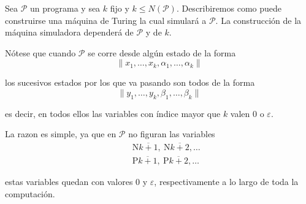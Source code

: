 \begin{frame}
	\PN Sea $\mathcal{P}$ un programa y sea $k$ fijo y $k \leq N(\mathcal{P})$. Describiremos como puede construirse una
	máquina de Turing la cual simulará a $\mathcal{P}$. La construcción de la máquina simuladora dependerá de
	$\mathcal{P}$ y de $k$.

	\PN Nótese que cuando $\mathcal{P}$ se corre desde algún estado de la forma
	\begin{equation*}
		\lVert x_{1}, \dotsc, x_{k}, \alpha_{1}, \dotsc, \alpha_{k} \rVert
	\end{equation*}

	\PN los sucesivos estados por los que va pasando son todos de la forma
	\begin{equation*}
		\lVert y_{1}, \dotsc, y_{k}, \beta_{1}, \dotsc, \beta_{k} \rVert
	\end{equation*}

	\PN es decir, en todos ellos las variables con índice mayor que $k$ valen $0$ o $\varepsilon$.

	\PN La razon es simple, ya que en $\mathcal{P}$ no figuran las variables
	\begin{eqnarray*}
		&&\mathrm{N}\overline{k+1}, \ \mathrm{N}\overline{k+2}, \dotsc \\
		&&\mathrm{P}\overline{k+1}, \ \mathrm{P}\overline{k+2}, \dotsc
	\end{eqnarray*}

	\PN estas variables quedan con valores $0$ y $\varepsilon$, respectivamente a lo largo de toda la computación.
\end{frame}
